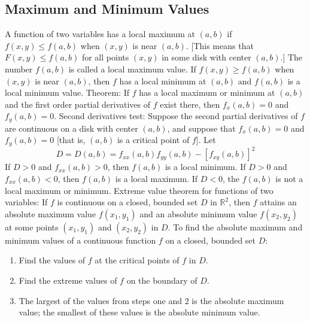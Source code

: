 \documentclass{article}
\begin{document}
    \begin{multicols}{2}
        
    \subsection{Maximum and Minimum Values}
    \begin{outline}
        \1 A function of two variables has a local maximum at \((a,b)\) if \(f(x,y)\leq f(a,b)\) when \((x,y)\) is near \((a,b)\). [This means that \(F(x,y)\leq f(a,b)\) for all points \((x,y)\) in some disk with center \((a,b)\).] The number \(f(a,b)\) is called a local maximum value. If \(f(x,y)\geq f(a,b)\) when \((x,y)\) is near \((a,b)\), then $f$ has a local minimum at \((a,b)\) and \(f(a,b)\) is a local minimum value. 
        \1 Theorem: If $f$ has a local maximum or minimum at \((a,b)\) and the first order partial derivatives of $f$ exist there, then \(f_x(a,b)=0\) and \(f_y(a,b)=0\). 
        \1 Second derivatives test: Suppose the second partial derivatives of $f$ are continuous on a disk with center \((a,b)\), and suppose that \(f_x(a,b)=0\) and \(f_y(a,b)=0\) [that is, \((a,b)\) is a critical point of $f$]. Let \[D=D(a,b)=f_{xx}(a,b)f_{yy}(a,b)-[f_{xy}(a,b)]^2\]
            \2 If \(D>0\) and \(f_{xx}(a,b)>0\), then \(f(a,b)\) is a local minimum. 
            \2 If \(D>0\) and \(f_{xx}(a,b)<0\), then \(f(a,b)\) is a local maximum. 
            \2 If \(D<0\), the \(f(a,b)\) is not a local maximum or minimum. 
        \1 Extreme value theorem for functions of two variables: If $f$ is continuous on a closed, bounded set $D$ in \(\mathbb{R}^2\), then $f$ attains an absolute maximum value \(f(x_1,y_1)\) and an absolute minimum value \(f(x_2,y_2)\) at some points \((x_1,y_1)\) and \((x_2,y_2)\) in $D$. 
        \1 To find the absolute maximum and minimum values of a continuous function $f$ on a closed, bounded set $D$:
    \0 
        \begin{enumerate}
            \item Find the values of $f$ at the critical points of $f$ in $D$. 
            \item Find the extreme values of $f$ on the boundary of $D$. 
            \item The largest of the values from steps one and 2 is the absolute maximum value; the smallest of these values is the absolute minimum value. 
        \end{enumerate}

    \end{outline}

\end{multicols}
\end{document}
